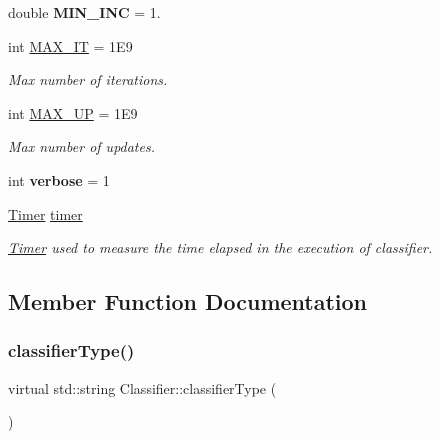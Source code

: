 \begin{DoxyCompactItemize}
double {\bfseries M\+I\+N\+\_\+\+I\+NC} = 1.
\item 
\mbox{\label{class_classifier_a9cab88ab4489d771256bffb1717c1644}} 
int \hyperlink{class_classifier_a9cab88ab4489d771256bffb1717c1644}{M\+A\+X\+\_\+\+IT} = 1\+E9
\begin{DoxyCompactList}\small\item\em Max number of iterations. \end{DoxyCompactList}\item 
\mbox{\label{class_classifier_abb8b95854801151e78a1d9f6a2173c22}} 
int \hyperlink{class_classifier_abb8b95854801151e78a1d9f6a2173c22}{M\+A\+X\+\_\+\+UP} = 1\+E9
\begin{DoxyCompactList}\small\item\em Max number of updates. \end{DoxyCompactList}\item 
\mbox{\label{class_classifier_a2b24f7f87ca8171ce07c888583646263}} 
int {\bfseries verbose} = 1
\item 
\mbox{\label{class_classifier_ae9d28253495ae8807d586faff951d46f}} 
\hyperlink{class_timer}{Timer} \hyperlink{class_classifier_ae9d28253495ae8807d586faff951d46f}{timer}
\begin{DoxyCompactList}\small\item\em \hyperlink{class_timer}{Timer} used to measure the time elapsed in the execution of classifier. \end{DoxyCompactList}\end{DoxyCompactItemize}


\subsection{Member Function Documentation}
\mbox{\label{class_classifier_a7bfe7cc88b851b4a7e7ec55b30dd844e}} 
\subsubsection{\texorpdfstring{classifier\+Type()}{classifierType()}}
{\footnotesize\ttfamily virtual std\+::string Classifier\+::classifier\+Type (\begin{DoxyParamCaption}{ }\end{DoxyParamCaption})\hspace{0.3cm}{\ttfamily [pure virtual]}}



